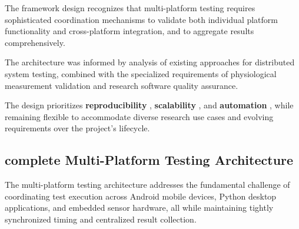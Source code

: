 {{The framework design recognizes that multi-platform testing requires
sophisticated coordination mechanisms to validate both individual platform
functionality and cross-platform integration, and to aggregate results
comprehensively.

The architecture was informed by analysis of existing approaches for distributed
system testing, combined with the specialized requirements of physiological
measurement validation and research software quality assurance.

The design prioritizes \textbf{reproducibility}
, \textbf{scalability}
, and \textbf{automation}
, while remaining flexible to accommodate diverse research use cases and
evolving requirements over the project's lifecycle.

\subsection{complete Multi-Platform Testing Architecture}

The multi-platform testing architecture addresses the fundamental challenge of
coordinating test execution across Android mobile devices, Python desktop
applications, and embedded sensor hardware, all while maintaining tightly
synchronized timing and centralized result collection.

}}

